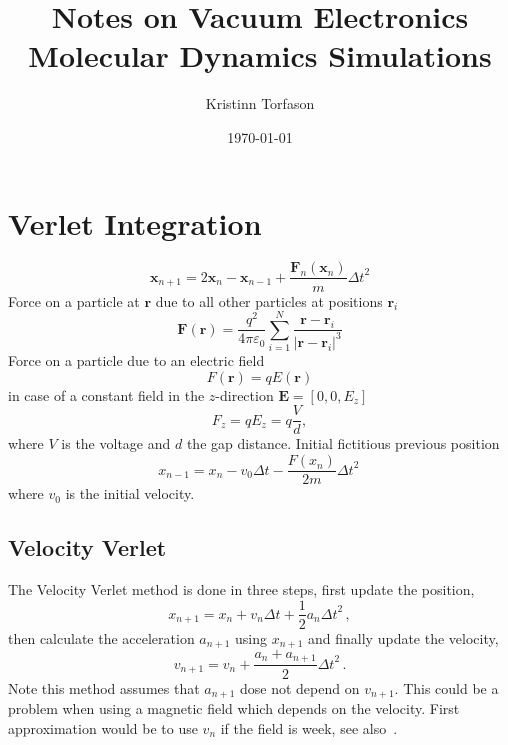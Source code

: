 \documentclass[a4paper,10pt]{article}
\title{Notes on Vacuum Electronics Molecular Dynamics Simulations}
\author{Kristinn Torfason}
\date{\today}
\numberwithin{equation}{section}
\begin{document}
\maketitle\thispagestyle{empty}
\newpage

\section{Verlet Integration}
\begin{equation}
\mathbf{x}_{n+1} = 2\mathbf{x}_{n} - \mathbf{x}_{n-1} + \frac{\mathbf{F}_{n}(\mathbf{x}_{n})}{m} {\Delta t}^{2}
\end{equation}
Force on a particle at \(\mathbf{r}\) due to all other particles at positions \(\mathbf{r}_i\)
\begin{equation}
  \mathbf{F}(\mathbf{r}) = \frac{q^2}{4\pi\varepsilon_0} \sum_{i=1}^{N} \frac{\mathbf{r} - \mathbf{r}_i}{|\mathbf{r} - \mathbf{r}_i|^3}
\end{equation}
Force on a particle due to an electric field
\begin{equation}
  F(\mathbf{r}) = qE(\mathbf{r})
\end{equation}
in case of a constant field in the \(z\)-direction \(\mathbf{E} = \left[ 0, 0, E_z \right]\)
\begin{equation}
 F_z = qE_z = q \frac{V}{d},
\end{equation}
where \(V\) is the voltage and \(d\) the gap distance.
Initial fictitious previous position
\begin{equation}
 x_{n-1} = x_n - v_0{\Delta t} - \frac{F(x_n)}{2 m} {\Delta t}^2\,
\end{equation}
where \(v_0\) is the initial velocity.

\subsection{Velocity Verlet}
  The Velocity Verlet method is done in three steps, first update the position,
  \begin{equation}
    x_{n+1} = x_n + v_n\Delta t + \frac{1}{2}a_n{\Delta t}^2\, ,
  \end{equation}
  then calculate the acceleration \(a_{n+1}\) using \(x_{n+1}\) and finally
  update the velocity,
  \begin{equation}
    v_{n+1} = v_n + \frac{a_n + a_{n+1}}{2}{\Delta t}^2\, .
  \end{equation}
  Note this method assumes that \(a_{n+1}\) dose not depend on \(v_{n+1}\).
  This could be a problem when using a magnetic field which depends on the
  velocity. First approximation would be to use \(v_n\) if the field is week,
  see also~\cite{SPREITER1999102}.
\end{document}

